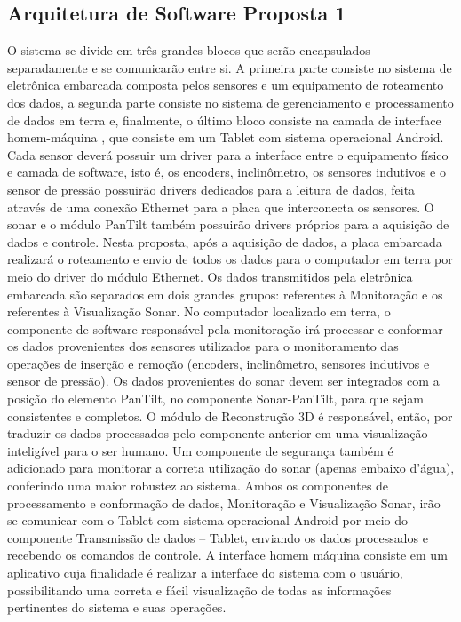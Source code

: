 \subsection{Arquitetura de Software Proposta 1}
O sistema se divide em três grandes blocos que serão encapsulados separadamente e se comunicarão entre si. A primeira parte consiste no sistema de eletrônica embarcada composta pelos sensores e um equipamento de roteamento dos dados, a segunda parte consiste no sistema de gerenciamento e processamento de dados em terra e, finalmente, o último bloco consiste na camada de interface homem-máquina , que consiste em um Tablet com sistema operacional Android.
Cada sensor deverá possuir um driver para a interface entre o equipamento físico e camada de software, isto é, os encoders, inclinômetro, os sensores indutivos e o sensor de pressão possuirão drivers dedicados para a leitura de dados, feita através de uma conexão Ethernet para a placa que interconecta os sensores. O sonar e o módulo PanTilt também possuirão drivers próprios para a aquisição de dados e controle. 
Nesta proposta, após a aquisição de dados, a placa embarcada realizará o roteamento e envio de todos os dados para o computador em terra por meio do driver do módulo Ethernet.  Os dados transmitidos pela eletrônica embarcada são separados em dois grandes grupos: referentes à Monitoração e os referentes à Visualização Sonar. 
No computador localizado em terra, o componente de software responsável pela monitoração irá processar e conformar os dados provenientes dos sensores utilizados para o monitoramento das operações de inserção e remoção (encoders, inclinômetro, sensores indutivos e sensor de pressão). Os dados provenientes do sonar devem ser integrados com a posição do elemento PanTilt, no componente Sonar-PanTilt, para que sejam consistentes e completos.  O módulo de Reconstrução 3D é responsável, então, por traduzir os dados processados pelo componente anterior em uma visualização inteligível para o ser humano.  Um componente de segurança também é adicionado para monitorar a correta utilização do sonar (apenas embaixo d’água), conferindo uma maior robustez ao sistema. 
Ambos os componentes de processamento e conformação de dados, Monitoração e Visualização Sonar, irão se comunicar com o Tablet com sistema operacional Android por meio do componente Transmissão de dados – Tablet, enviando os dados processados e recebendo os comandos de controle.  A interface homem máquina consiste em um aplicativo cuja finalidade é realizar a interface do sistema com o usuário, possibilitando uma correta e fácil visualização de todas as informações pertinentes do sistema e suas operações.


